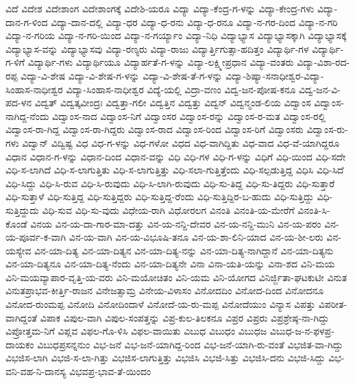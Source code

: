 ವಿದೆ
ವಿದೇಶ
ವಿದೇಶಾಂಗ
ವಿದೇಶಾಂಗಕ್ಕೆ
ವಿದೇಶಿ-ಯರೂ
ವಿದ್ಯಾ
ವಿದ್ಯಾ-ಕೆಂದ್ರ-ಗ-ಳನ್ನು
ವಿದ್ಯಾ-ಕೇಂದ್ರ-ಗಳು
ವಿದ್ಯಾ-ದಾನ-ಗ-ಳಿಂದ
ವಿದ್ಯಾ-ದಾನ-ದಲ್ಲಿ
ವಿದ್ಯಾ-ಧರ
ವಿದ್ಯಾ-ಧ-ರನು
ವಿದ್ಯಾ-ಧ-ರನೂ
ವಿದ್ಯಾ-ನ-ಗರ-ದಿಂದ
ವಿದ್ಯಾ-ನ-ಗರಿ
ವಿದ್ಯಾ-ನ-ಗರಿಯ
ವಿದ್ಯಾ-ನ-ಗರಿ-ಯಿಂದ
ವಿದ್ಯಾ-ನ-ಗರ್ಯ್ಯಾಂ
ವಿದ್ಯಾ-ನಿಧಿ
ವಿದ್ಯಾಭ್ಯಾಸ
ವಿದ್ಯಾಭ್ಯಾಸಕ್ಕಾಗಿ
ವಿದ್ಯಾಭ್ಯಾಸಕ್ಕೆ
ವಿದ್ಯಾಭ್ಯಾಸ-ವನ್ನು
ವಿದ್ಯಾಭ್ಯಾಸವು
ವಿದ್ಯಾ-ರಣ್ಯರು
ವಿದ್ಯಾ-ರಾಜು
ವಿದ್ಯಾರ್ತ್ತಿಗುತ್ಸಾ-ಹದಿತ್ತಂ
ವಿದ್ಯಾರ್ಥಿ-ಗಳ
ವಿದ್ಯಾರ್ಥಿ-ಗ-ಳಿಗೆ
ವಿದ್ಯಾರ್ಥಿ-ಗಳು
ವಿದ್ಯಾರ್ಥಿಯೂ
ವಿದ್ಯಾರ್ಹತೆ-ಗ-ಳನ್ನು
ವಿದ್ಯಾ-ಲಕ್ಷ್ಮೀಪ್ರಧಾನ
ವಿದ್ಯಾ-ವಂತರು
ವಿದ್ಯಾ-ವಿಶಾ-ರದ-ರಪ್ಪ
ವಿದ್ಯಾ-ವಿ-ಶೇಷ
ವಿದ್ಯಾ-ವಿ-ಶೇಷ-ಗ-ಳನ್ನು
ವಿದ್ಯಾ-ವಿ-ಶೇಷ-ತೆ-ಗ-ಳನ್ನು
ವಿದ್ಯಾ-ಶಿಷ್ಯಾ-ಸನಾಧೀಶ್ವರ-ವಿದ್ಯಾ-ಸಿಂಹಾಸ-ನಾಧೀಶ್ವರ
ವಿದ್ಯಾ-ಸಿಂಹಾಸ-ನಾಧೀಶ್ವರ
ವಿದ್ಯೆ-ಯಲ್ಲಿ
ವಿದ್ರಾ-ವಣಂ
ವಿದ್ವ-ಜನ-ಪೋಷ-ಕನೂ
ವಿದ್ವ-ಜನ-ವಿ-ಪದ-ಳನ
ವಿದ್ವತ್
ವಿದ್ವತ್ಕವೀಂದ್ರಃ
ವಿದ್ವತ್ತಾ-ಗಲೀ
ವಿದ್ವತ್ತಿನ
ವಿದ್ವತ್ತು
ವಿದ್ವನ್
ವಿದ್ವನ್ಮಂಡ-ಲಿಯ
ವಿದ್ವಾಂಸ
ವಿದ್ವಾಂಸ-ನಾಗಿದ್ದ-ನೆಂದು
ವಿದ್ವಾಂಸ-ನಾದ
ವಿದ್ವಾಂಸ-ನಿಗೆ
ವಿದ್ವಾಂಸರ
ವಿದ್ವಾಂಸ-ರನ್ನು
ವಿದ್ವಾಂಸ-ರ-ಮತ
ವಿದ್ವಾಂಸ-ರಲ್ಲಿ
ವಿದ್ವಾಂಸ-ರಾ-ಗಿದ್ದ
ವಿದ್ವಾಂಸ-ರಾ-ಗಿದ್ದರು
ವಿದ್ವಾಂಸ-ರಾದ
ವಿದ್ವಾಂಸ-ರಿಂದ
ವಿದ್ವಾಂಸ-ರಿಗೆ
ವಿದ್ವಾಂಸರು
ವಿದ್ವಾಂಸ-ರು-ಗಳು
ವಿದ್ವಾನ್
ವಿದ್ವಿಷ್ಟ
ವಿಧ
ವಿಧ-ಗ-ಳನ್ನು
ವಿಧ-ಗಳೋ
ವಿಧದ
ವಿಧ-ವಾಗಿದ್ದಿತು
ವಿಧ-ವಾದ
ವಿಧ-ವೆ-ಯಾಗಿದ್ದರೂ
ವಿಧಾನ
ವಿಧಾನ-ಗ-ಳನ್ನು
ವಿಧಾನ-ದಿಂದ
ವಿಧಾನ-ವನ್ನು
ವಿಧಿ
ವಿಧಿ-ಗಳ
ವಿಧಿ-ಗ-ಳನ್ನು
ವಿಧಿಗೆ
ವಿಧಿ-ಯಿಂದ
ವಿಧಿ-ಸದೇ
ವಿಧಿ-ಸ-ಲಾಗಿದೆ
ವಿಧಿ-ಸ-ಲಾಗುತ್ತಿತು
ವಿಧಿ-ಸ-ಲಾಗುತ್ತಿತ್ತು
ವಿಧಿ-ಸಲಾ-ಗುತ್ತಿತ್ತೆಂದು
ವಿಧಿ-ಸಲ್ಪಡುತ್ತಿದ್ದ
ವಿಧಿಸಿ
ವಿಧಿ-ಸಿದೆ
ವಿಧಿ-ಸಿದ್ದು
ವಿಧಿ-ಸಿ-ರುವ
ವಿಧಿ-ಸಿ-ರುವುದು
ವಿಧಿ-ಸಿ-ಲಾಗಿ-ರುವುದು
ವಿಧಿ-ಸು-ತಿದ್ದ
ವಿಧಿ-ಸು-ತಿದ್ದರು
ವಿಧಿ-ಸುತ್ತಾರೆ
ವಿಧಿ-ಸುತ್ತಾಳೆ
ವಿಧಿ-ಸುತ್ತಿದ್ದ
ವಿಧಿ-ಸುತ್ತಿದ್ದರು
ವಿಧಿ-ಸುತ್ತಿದ್ದ-ರೆಂದು
ವಿಧಿ-ಸುತ್ತಿದ್ದಿರ-ಬ-ಹುದು
ವಿಧಿ-ಸುತ್ತಿದ್ದು
ವಿಧಿ-ಸುತ್ತಿದ್ದುದು
ವಿಧಿ-ಸುವ
ವಿಧಿ-ಸು-ವುದು
ವಿಧೇಯ-ರಾಗಿ
ವಿಧೋರಲಗ
ವಿನಂತಿ
ವಿನಂತಿ-ಯ-ಮೇರೆಗೆ
ವಿನಂತಿ-ಸಿ-ಕೊಂಡೆ
ವಿನಯ
ವಿನ-ಯ-ದಾ-ಗಾರ-ಮಾ-ದತ್ತು
ವಿನ-ಯ-ನನ್ದಿ-ದೇವರ
ವಿನ-ಯ-ನನ್ದಿ-ಮುನಿ
ವಿನ-ಯ-ಪರಂ
ವಿನ-ಯ-ಪೂರ್ವ-ಕ-ವಾಗಿ
ವಿನ-ಯ-ವಾಗಿ
ವಿನ-ಯ-ವಿಭೂಷಿ-ತನೂ
ವಿನ-ಯ-ಶಾ-ಲಿನಿ-ಯಾದ
ವಿನ-ಯ-ಶೀ-ಲರು
ವಿನ-ಯಸ್ಯೇವ
ವಿನ-ಯಾ-ದಿತ್ಯ
ವಿನ-ಯಾ-ದಿತ್ಯನ
ವಿನ-ಯಾ-ದಿತ್ಯ-ನನ್ನು
ವಿನ-ಯಾ-ದಿತ್ಯ-ನಾಗಿದ್ದಾನೆ
ವಿನ-ಯಾ-ದಿತ್ಯನು
ವಿನ-ಯಾ-ದಿತ್ಯನೂ
ವಿನ-ಯಾ-ದಿತ್ಯ-ನೆಂದು
ವಿನ-ಯಾ-ದಿತ್ಯನೇ
ವಿನಾ
ವಿನಾ-ಯತಿ-ಯನ್ನು
ವಿನಾ-ಶದ
ವಿನಿ-ಮಯ
ವಿನಿ-ಮಯವ್ಯಾಪಾರ-ವೃತ್ತಿ-ಯ-ವರು
ವಿನಿ-ಮಯೋಚಿತಂ
ವಿನಿ-ಯಮ
ವಿನಿ-ಯೋಗದ
ವಿನಿರ್ಜ್ಜಿತಾ-ಘಟಕುಟೀ
ವಿನುತ
ವಿನುತಪ್ರಾಭವ-ಕೀರ್ತ್ತಿ-ರಾಜನ
ವಿನೇಜತ್ಸಾಮ್ರ
ವಿನೇಯ-ವಿಳಾಸಂ
ವಿನೋದದಿಂ
ವಿನೋದ-ದಿಂದ
ವಿನೋದನೂ
ವಿನೋದ-ರುಂಮಪ್ಪ
ವಿನೋದಿ
ವಿನೋದಿಂದಾಳೆ
ವಿನೋದೆ-ಯ-ರು-ಮಪ್ಪ
ವಿನೋದೆಯುಂ
ವಿನ್ಯಾಸ
ವಿಪತ್ತು
ವಿಪರೀತ-ವಾಗಿದ್ದಂತೆ
ವಿಪಾಕ
ವಿಪುಲ-ವಾಗಿ
ವಿಪುಲ-ಸಂಪತ್ತನ್ನು
ವಿಪ್ರ-ಕುಲ-ತಿಲಕನೂ
ವಿಪ್ರರ
ವಿಪ್ರರು
ವಿಪ್ರಶ್ರೇಷ್ಠ-ನಾ-ಗಿದ್ದು
ವಿಪ್ರೋತ್ತಮ-ನಿಗೆ
ವಿಪ್ಲವ
ವಿಫಲ-ಗೊ-ಳಿಸಿ
ವಿಫಲ-ವಾಯಿತು
ವಿಬುಧ
ವಿಬುಧಂ
ವಿಬುಧಜ
ವಿಬುಧ-ಜ-ನ-ಫಳಪ್ರ-ದಾಯಕಂ
ವಿಬುಧಪ್ರಸನ್ನನುಂ
ವಿಭ-ಜನೆ
ವಿಭ-ಜನೆ-ಯಾಗಿದ್ದ-ರಿಂದ
ವಿಭ-ಜನೆ-ಯಾಗಿ-ರು-ವಂತೆ
ವಿಭಜಿತ-ವಾ-ಗಿದ್ದು
ವಿಭಜಿಸ-ಲಾಗಿ
ವಿಭಜಿ-ಸ-ಲಾ-ಗಿತ್ತು
ವಿಭಜಿಸ-ಲಾಗುತ್ತಿತ್ತು
ವಿಭಜಿಸಿ
ವಿಭಜಿ-ಸಿತ್ತು
ವಿಭಜಿಸಿ-ದನು
ವಿಭಜಿ-ಸಿದ್ದು
ವಿಭ-ವನಿ-ವಹ-ನಿ-ದಾನಸ್ಯ
ವಿಭವಪ್ರ-ಭಾವ-ತೆ-ಯಿಂದಂ
